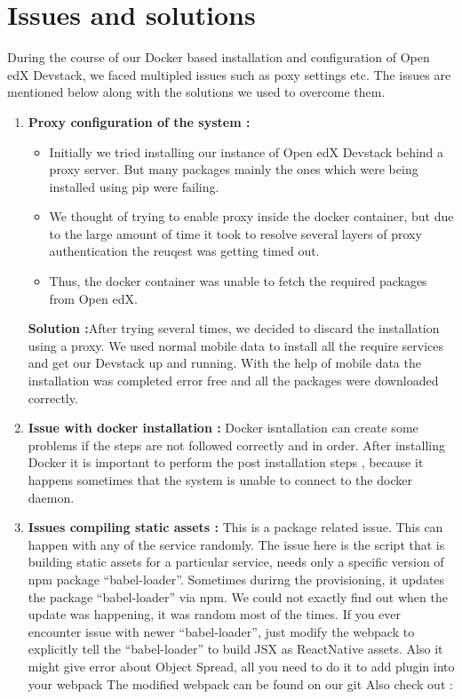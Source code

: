 \section{Issues and solutions}
During the course of our Docker based installation and configuration of Open edX Devstack,
we faced multipled issues such as poxy settings etc. The issues are mentioned below along
with the solutions we used to overcome them.
\begin{enumerate}
	\item \textbf{Proxy configuration of the system :}\newline
		\begin{itemize}
		\item Initially we tried installing our instance of Open edX Devstack behind a proxy server. But
many packages mainly the ones which were being installed using pip were failing.
		\item We thought of trying to enable proxy inside the docker container, but due to the large
amount of time it took to resolve several layers of proxy authentication the reuqest was
getting timed out.
		\item Thus, the docker container was unable to fetch the required packages from Open edX.
		\end{itemize}
		\textbf{Solution :}After trying several times, we decided to discard the installation using a proxy.
We used normal mobile data to install all the require services and get our Devstack up and
running. With the help of mobile data the installation was completed error free and all the
packages were downloaded correctly.
	\item \textbf{Issue with docker installation : }\newline
		Docker isntallation can create some problems if the steps are not followed correctly and in
order. After installing Docker it is important to perform the post installation steps ,
because it happens sometimes that the system is unable to connect to the docker daemon.
	\item \textbf{Issues compiling static assets : }\newline
This is a package related issue. This can happen with any of the service randomly. The issue here is
the script that is building static assets for a particular service, needs only a specific version of npm
package “babel-loader”. Sometimes durirng the provisioning, it updates the package “babel-loader”
via npm. We could not exactly find out when the update was happening, it was random most of the
times. If you ever encounter issue with newer “babel-loader”, just modify the webpack to explicitly
tell the “babel-loader” to build JSX as ReactNative assets. Also it might give error about Object
Spread, all you need to do it to add plugin into your webpack\newline
The modified webpack can be found on our git\newline
Also check out :\newline


\end{enumerate}
